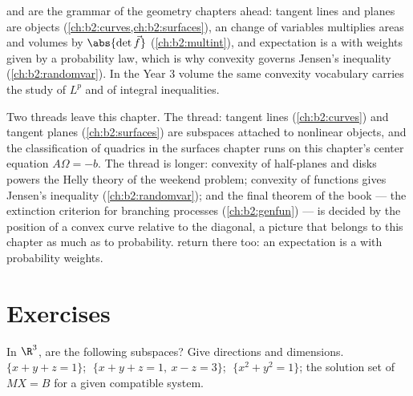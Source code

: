 \begin{remark}
 and  are the grammar of the geometry
chapters ahead: tangent lines and planes are  objects
(\cref{ch:b2:curves,ch:b2:surfaces}), an  change of
variables multiplies areas and volumes by
$\abs{\det \vec f}$ (\cref{ch:b2:multint}), and expectation
is a  with weights given by a probability law, which
is why convexity governs Jensen's inequality
(\cref{ch:b2:randomvar}). In the Year 3 volume the same
convexity vocabulary carries the study of $L^p$  and of
integral inequalities.
\end{remark}

\begin{remark}
Two threads leave this chapter. The \emph{} thread:
tangent lines (\cref{ch:b2:curves}) and tangent planes
(\cref{ch:b2:surfaces}) are  subspaces attached to
nonlinear objects, and the classification of quadrics in the
surfaces chapter runs on this chapter's center equation
$A\Omega = -b$. The \emph{} thread is longer: convexity
of half-planes and disks powers the Helly theory of the
weekend problem; convexity of functions gives Jensen's
inequality (\cref{ch:b2:randomvar}); and the final theorem of
the book --- the extinction criterion for branching processes
(\cref{ch:b2:genfun}) --- is decided by the position of a
convex curve relative to the diagonal, a picture that belongs
to this chapter as much as to probability. 
return there too: an expectation is a  with
probability weights.
\end{remark}

\section{Exercises}

\begin{exercise}[$\star$]\label{exo:b2:affine:1}
In $\R^3$, are the following  subspaces? Give directions and
dimensions. $\{x + y + z = 1\}$; $\;\{x + y + z = 1,\ x - z =
3\}$; $\;\{x^2 + y^2 = 1\}$; the solution set of $MX = B$ for a
given compatible system.
\end{exercise}

